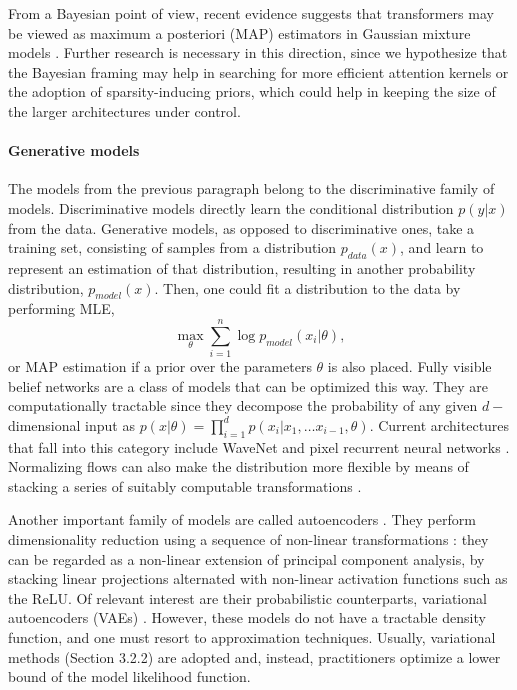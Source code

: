 From a Bayesian point of view, recent evidence suggests that transformers may be viewed as maximum 
a posteriori (MAP) estimators in 
 Gaussian mixture models \cite{movellan2020probabilistic}. Further research is necessary in this direction, since we hypothesize that the Bayesian framing may help in searching for more efficient attention kernels or the adoption of sparsity-inducing priors, which could help in keeping the size of the larger architectures under control.


\paragraph{Generative models} 
The models from the previous paragraph belong to the discriminative family of models. Discriminative models directly learn the conditional distribution $p(y|x)$ from the data.
Generative models, as opposed to discriminative ones, take a training set, consisting of samples from a distribution $p_{data}(x)$, and learn to represent an estimation of that distribution, resulting in another probability distribution, $p_{model}(x)$. Then, one could fit a distribution to the data by performing MLE,
$$
\max_{\theta} \sum_{i=1}^n \log p_{model} (x_i | \theta),
$$
or MAP estimation if a prior over the parameters $\theta$ is also placed. Fully visible belief networks \cite{10.5555/2998828.2998922} are a class of models that can be optimized this way. They are computationally tractable since they decompose the probability of any given $d-$dimensional input as $p(x | \theta) = \prod_{i=1}^d p(x_i | x_1 , \ldots x_{i-1}, \theta)$. Current architectures that fall into this category include WaveNet \cite{oord2016wavenet} and pixel recurrent neural networks \cite{pmlr-v48-oord16}. Normalizing flows can also make the distribution more flexible by means of stacking a series of suitably computable transformations \cite{pmlr-v37-rezende15}.

Another important family of models are called autoencoders \cite{autoencoders}. They perform dimensionality reduction 
using a sequence of non-linear transformations \cite{baldi2012autoencoders}: they can be regarded as a non-linear extension of principal component analysis, by stacking linear projections alternated with non-linear activation functions such as the ReLU. 
Of relevant interest are their probabilistic counterparts, variational autoencoders (VAEs) \cite{kingma2013auto}. However, these models do not have a tractable density function, and one must resort to approximation techniques. Usually, variational methods (Section 3.2.2) are adopted and, instead, practitioners optimize a lower bound of the model likelihood function.

